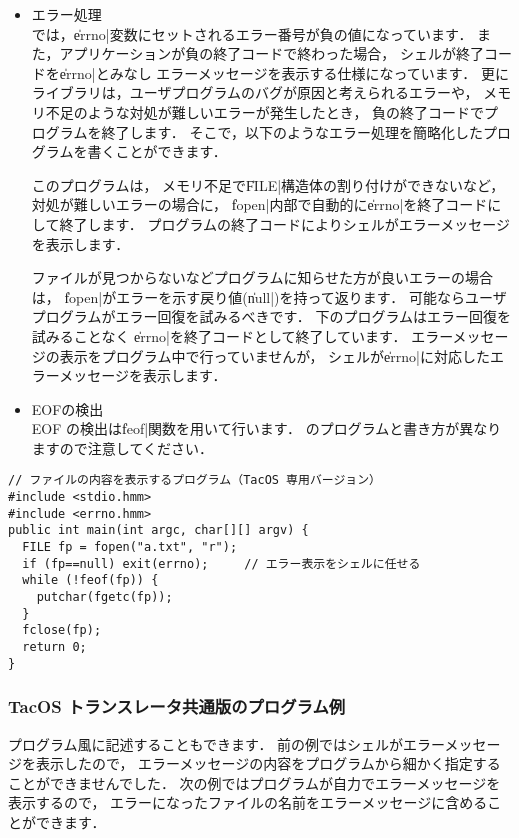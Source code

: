 \begin{itemize}
\item エラー処理 \\
\tacos では，\|errno|変数にセットされるエラー番号が負の値になっています．
また，アプリケーションが負の終了コードで終わった場合，
シェルが終了コードを\|errno|とみなし
エラーメッセージを表示する仕様になっています．
更にライブラリは，ユーザプログラムのバグが原因と考えられるエラーや，
メモリ不足のような対処が難しいエラーが発生したとき，
負の終了コードでプログラムを終了します．
そこで，以下のようなエラー処理を簡略化したプログラムを書くことができます．

このプログラムは，
メモリ不足で\|FILE|構造体の割り付けができないなど，
対処が難しいエラーの場合に，
\|fopen|内部で自動的に\|errno|を終了コードにして終了します．
プログラムの終了コードによりシェルがエラーメッセージを表示します．

ファイルが見つからないなどプログラムに知らせた方が良いエラーの場合は，
\|fopen|がエラーを示す戻り値(\|null|)を持って返ります．
可能ならユーザプログラムがエラー回復を試みるべきです．
下のプログラムはエラー回復を試みることなく
\|errno|を終了コードとして終了しています．
エラーメッセージの表示をプログラム中で行っていませんが，
シェルが\|errno|に対応したエラーメッセージを表示します．

\item EOFの検出 \\
EOF の検出は\|feof|関数を用いて行います．
{\cl}のプログラムと書き方が異なりますので注意してください．

\end{itemize}

\begin{mylist}
\begin{verbatim}
// ファイルの内容を表示するプログラム（TacOS 専用バージョン）
#include <stdio.hmm>
#include <errno.hmm>
public int main(int argc, char[][] argv) {
  FILE fp = fopen("a.txt", "r");
  if (fp==null) exit(errno);     // エラー表示をシェルに任せる
  while (!feof(fp)) {
    putchar(fgetc(fp));
  }
  fclose(fp);
  return 0;
}
\end{verbatim}
\label{chap4:cat1}
\end{mylist}

\subsubsection{TacOS トランスレータ共通版のプログラム例}

\cl プログラム風に記述することもできます．
前の例ではシェルがエラーメッセージを表示したので，
エラーメッセージの内容をプログラムから細かく指定することができませんでした．
次の例ではプログラムが自力でエラーメッセージを表示するので，
エラーになったファイルの名前をエラーメッセージに含めることができます．


